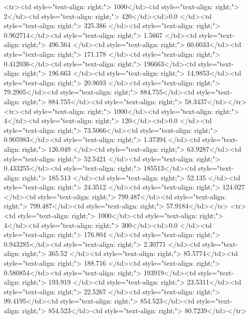 <tr><td style="text-align: right;">      1000</td><td style="text-align: right;">         2</td><td style="text-align: right;">           420</td><td>0.0          </td><td style="text-align: right;">               325.386 </td><td style="text-align: right;">           0.962714</td><td style="text-align: right;">         1.5667  </td><td style="text-align: right;">        496.564 </td><td style="text-align: right;">            60.6033</td><td style="text-align: right;">             171.178   </td><td style="text-align: right;">             0.412036</td><td style="text-align: right;">              196663</td><td style="text-align: right;">                      196.663 </td><td style="text-align: right;">            14.9853</td><td style="text-align: right;">                20.9693 </td><td style="text-align: right;">        79.2905</td><td style="text-align: right;">    884.755</td><td style="text-align: right;">       884.755</td><td style="text-align: right;">                 58.3437</td></tr>
<tr><td style="text-align: right;">      1000</td><td style="text-align: right;">         4</td><td style="text-align: right;">           120</td><td>0.0          </td><td style="text-align: right;">                73.5066</td><td style="text-align: right;">           0.905983</td><td style="text-align: right;">         1.37394 </td><td style="text-align: right;">        126.049 </td><td style="text-align: right;">            63.9287</td><td style="text-align: right;">              52.5421  </td><td style="text-align: right;">             0.433255</td><td style="text-align: right;">              185513</td><td style="text-align: right;">                      185.513 </td><td style="text-align: right;">            52.135 </td><td style="text-align: right;">                24.3512 </td><td style="text-align: right;">       124.027 </td><td style="text-align: right;">    799.487</td><td style="text-align: right;">       799.487</td><td style="text-align: right;">                 57.9184</td></tr>
<tr><td style="text-align: right;">      1000</td><td style="text-align: right;">         4</td><td style="text-align: right;">           300</td><td>0.0          </td><td style="text-align: right;">               176.804 </td><td style="text-align: right;">           0.943285</td><td style="text-align: right;">         2.30771 </td><td style="text-align: right;">        365.52  </td><td style="text-align: right;">            85.5774</td><td style="text-align: right;">             188.716   </td><td style="text-align: right;">             0.580854</td><td style="text-align: right;">              193919</td><td style="text-align: right;">                      193.919 </td><td style="text-align: right;">            23.5311</td><td style="text-align: right;">                22.5267 </td><td style="text-align: right;">        99.4195</td><td style="text-align: right;">    854.523</td><td style="text-align: right;">       854.523</td><td style="text-align: right;">                 80.7239</td></tr>
